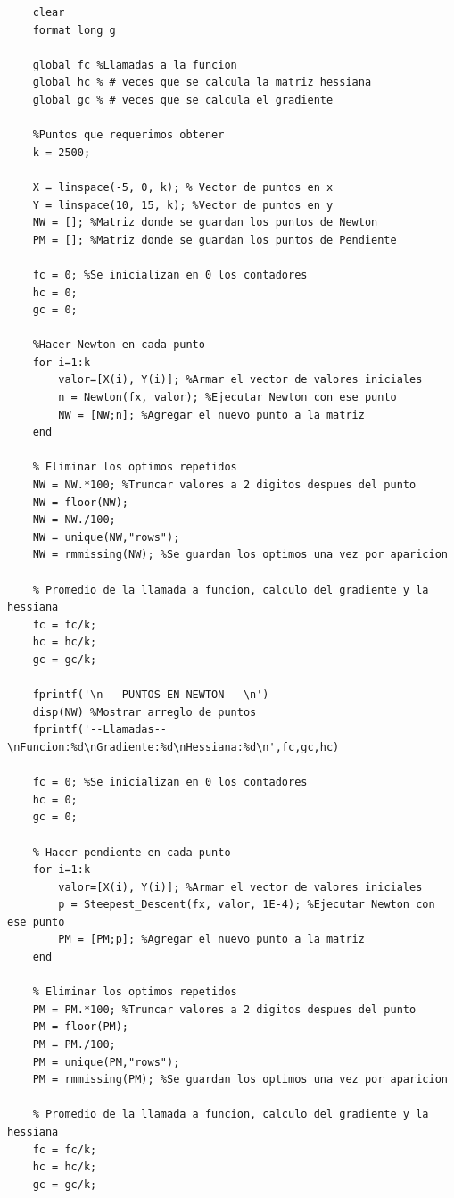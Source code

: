 \documentclass[12pt]{article}
\begin{document}
\begin{lstlisting}
    clear
    format long g
    
    global fc %Llamadas a la funcion
    global hc % # veces que se calcula la matriz hessiana
    global gc % # veces que se calcula el gradiente
    
    %Puntos que requerimos obtener
    k = 2500;
    
    X = linspace(-5, 0, k); % Vector de puntos en x
    Y = linspace(10, 15, k); %Vector de puntos en y
    NW = []; %Matriz donde se guardan los puntos de Newton
    PM = []; %Matriz donde se guardan los puntos de Pendiente
    
    fc = 0; %Se inicializan en 0 los contadores
    hc = 0;
    gc = 0;
    
    %Hacer Newton en cada punto
    for i=1:k
        valor=[X(i), Y(i)]; %Armar el vector de valores iniciales
        n = Newton(fx, valor); %Ejecutar Newton con ese punto
        NW = [NW;n]; %Agregar el nuevo punto a la matriz
    end
    
    % Eliminar los optimos repetidos
    NW = NW.*100; %Truncar valores a 2 digitos despues del punto
    NW = floor(NW);
    NW = NW./100; 
    NW = unique(NW,"rows");
    NW = rmmissing(NW); %Se guardan los optimos una vez por aparicion
    
    % Promedio de la llamada a funcion, calculo del gradiente y la hessiana
    fc = fc/k;
    hc = hc/k;
    gc = gc/k;
    
    fprintf('\n---PUNTOS EN NEWTON---\n')
    disp(NW) %Mostrar arreglo de puntos
    fprintf('--Llamadas--\nFuncion:%d\nGradiente:%d\nHessiana:%d\n',fc,gc,hc)
    
    fc = 0; %Se inicializan en 0 los contadores
    hc = 0;
    gc = 0;
    
    % Hacer pendiente en cada punto
    for i=1:k
        valor=[X(i), Y(i)]; %Armar el vector de valores iniciales
        p = Steepest_Descent(fx, valor, 1E-4); %Ejecutar Newton con ese punto
        PM = [PM;p]; %Agregar el nuevo punto a la matriz
    end
    
    % Eliminar los optimos repetidos
    PM = PM.*100; %Truncar valores a 2 digitos despues del punto
    PM = floor(PM);
    PM = PM./100;
    PM = unique(PM,"rows");
    PM = rmmissing(PM); %Se guardan los optimos una vez por aparicion
    
    % Promedio de la llamada a funcion, calculo del gradiente y la hessiana
    fc = fc/k;
    hc = hc/k;
    gc = gc/k;
    

\end{lstlisting}
\end{document}
